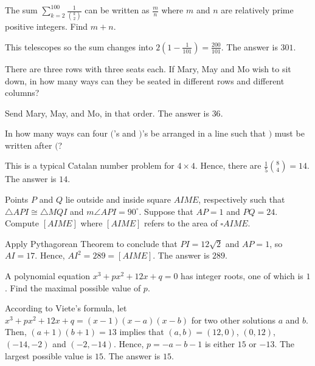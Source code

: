 \begin{problem}
The sum $\sum_{k=2}^{100}\frac{1}{\binom{k}{2}}$ can be written as $\frac{m}{n}$ where $m$ and $n$ are relatively prime positive integers. Find $m+n$.
\end{problem}

\begin{solution}
This telescopes so the sum changes into $2(1-\frac{1}{101})=\frac{200}{101}$. The answer is $301$.
\end{solution}

\begin{problem}
There are three rows with three seats each. If Mary, May and Mo wish to sit down, in how many ways can they be seated in different rows and different columns?
\end{problem}

\begin{solution}
Send Mary, May, and Mo, in that order. The answer is $36$.
\end{solution}

\begin{problem}
In how many ways can four $($'s and $)$'s be arranged in a line such that $)$ must be written after $($?
\end{problem}

\begin{solution}
This is a typical Catalan number problem for $4\times4$. Hence, there are $\frac{1}{5}\binom{8}{4}=14$. The answer is $14$.
\end{solution}

\begin{problem}
Points $P$ and $Q$ lie outside and inside square $AIME$, respectively such that $\triangle API \cong \triangle MQI$ and $m\angle API = 90^\circ$. Suppose that $AP=1$ and $PQ=24$. Compute $[AIME]$ where $[AIME]$ refers to the area of $\square AIME$.
\end{problem}

\begin{solution}
Apply Pythagorean Theorem to conclude that $PI=12\sqrt{2}$ and $AP=1$, so $AI=17$. Hence, $AI^2=289=[AIME]$. The answer is $289$.
\end{solution}

\begin{problem}
A polynomial equation $x^3+px^2+12x+q=0$ has integer roots, one of which is $1$. Find the maximal possible value of $p$.
\end{problem}

\begin{solution}
According to Viete's formula, let $x^3+px^2+12x+q=(x-1)(x-a)(x-b)$ for two other solutions $a$ and $b$. Then, $(a+1)(b+1)=13$ implies that $(a,b)=(12,0)$, $(0,12)$, $(-14,-2)$ and $(-2,-14)$. Hence, $p=-a-b-1$ is either $15$ or $-13$. The largest possible value is $15$. The answer is $15$.
\end{solution}

